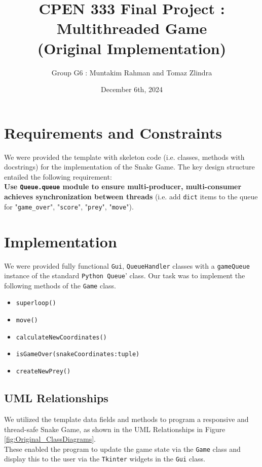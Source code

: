 \documentclass{article}
\title{CPEN 333 Final Project : Multithreaded Game \\ (Original Implementation)}
\author{Group G6 : Muntakim Rahman and Tomaz Zlindra}
\date{December 6th, 2024}
\begin{document}
\maketitle

\section{Requirements and Constraints}

We were provided the template with skeleton code (i.e. classes, methods with docstrings) for the implementation of the Snake Game.
The key design structure entailed the following requirement: \\

\textbf{Use \texttt{Queue.queue} module to ensure multi-producer, multi-consumer achieves synchronization between threads} (i.e. add \texttt{dict} items to the queue for "\texttt{game\_over}", "\texttt{score}", "\texttt{prey}", "\texttt{move}").

\section{Implementation}

We were provided fully functional \texttt{Gui}, \texttt{QueueHandler} classes with a \texttt{gameQueue} instance of the standard \texttt{Python Queue}' class.
Our task was to implement the following methods of the \texttt{Game} class.

\begin{itemize}
    \item \texttt{superloop()}
    \item \texttt{move()}
    \item \texttt{calculateNewCoordinates()}
    \item \texttt{isGameOver(snakeCoordinates:tuple)}
    \item \texttt{createNewPrey()}
\end{itemize}

\subsection{UML Relationships}

We utilized the template data fields and methods to program a responsive and thread-safe Snake Game, as shown in the UML Relationships in Figure \ref{fig:Original_ClassDiagrams}. \\

These enabled the program to update the game state via the \texttt{Game} class and display this to the user via the \texttt{Tkinter} widgets in the \texttt{Gui} class.
\end{document}
